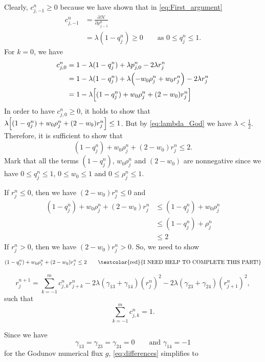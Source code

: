 Clearly, $c_{j,-1}^n \geq 0$ because we have shown that in \eqref{eq:First_argument}
\begin{align*}
    c_{j,-1}^n & =\frac{\partial \mathcal{H}}{\partial \rho_{j-1}^n}              \\
               & = \lambda(1-q_j^n) \geq 0 \qquad \text{as } 0 \leq q_j^n \leq 1.
\end{align*}
For $k= 0$, we have
\begin{align*}
    c_{j,0}^n & = 1 - \lambda (1- q_j^n) + \lambda p_{j,0}^n -2\lambda r_j^n                            \\
              & = 1 - \lambda (1- q_j^n) + \lambda \Bigl(-w_0\rho_j^n + w_0 r_j^n\Bigr) -2\lambda r_j^n \\
              & = 1- \lambda \Bigl[(1- q_j^n)+ w_0\rho_j^n  + (2-w_0)r_j^n\Bigr]
\end{align*}
In order to have  $c_{j,0}^n \geq 0$, it holds to show that $\lambda \Bigl[(1- q_j^n)+ w_0\rho_j^n  + (2-w_0)r_j^n\Bigr] \leq 1$. But by \eqref{eq:lambda_God} we have $\lambda < \frac{1}{2}$. Therefore, it is sufficient to show that
\[
    (1- q_j^n)+ w_0\rho_j^n  + (2-w_0)r_j^n \leq 2.
\]
Mark that all the terms $(1- q_j^n)$, $w_0\rho_j^n$ and $(2-w_0)$ are nonnegative since we have $ 0\leq q_j^n \leq 1$,  $0 \leq  w_0 \leq 1$ and  $0\leq \rho_j^n \leq 1$.

If $r_j^n \leq 0$, then we have $(2-w_0)r_j^n \leq 0$ and
\begin{align*}
    (1- q_j^n)+ w_0\rho_j^n  + (2-w_0)r_j^n & \leq (1- q_j^n)+ w_0\rho_j^n \\
                                            & \leq (1- q_j^n)+ \rho_j^n    \\
                                            & \leq 2
\end{align*}
If $r_j^n > 0$, then we have $(2-w_0)r_j^n > 0$. So, we need to show
\[
    (1- q_j^n)+ w_0\rho_j^n  + (2-w_0)r_j^n \leq 2 \qquad \text{\textcolor{red}{I NEED HELP TO COMPLETE THIS PART!}}
\]


\begin{equation}\label{eq:differences}
    r_j^{n+1}
    =
    \sum_{k=-1}^m c_{j,k}^n r_{j+k}^n
    -2\lambda(\gamma_{13}+\gamma_{14})(r_j^n)^2
    -2\lambda(\gamma_{23}+\gamma_{24})(r_{j+1}^n)^2,
\end{equation}
such that
\[\sum_{k=-1}^m c_{j,k}^n = 1.\]

Since we have
\[ \gamma_{13}= \gamma_{23}= \gamma_{24}=0 \qquad \text{and } \gamma_{14} = -1\]
for the Godunov numerical flux $g$, \eqref{eq:differences} simplifies to



